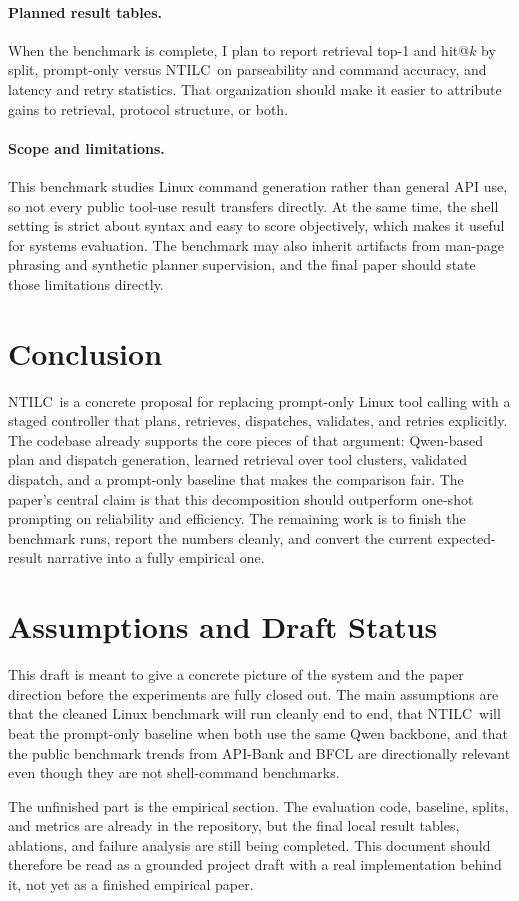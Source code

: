 \documentclass[10pt,twocolumn,letterpaper]{article}
\newcommand{\method}{NTILC}
\begin{document}
\paragraph{Planned result tables.}
When the benchmark is complete, I plan to report retrieval top-1 and hit@$k$ by split, prompt-only versus \method\ on parseability and command accuracy, and latency and retry statistics. That organization should make it easier to attribute gains to retrieval, protocol structure, or both.

\paragraph{Scope and limitations.}
This benchmark studies Linux command generation rather than general API use, so not every public tool-use result transfers directly. At the same time, the shell setting is strict about syntax and easy to score objectively, which makes it useful for systems evaluation. The benchmark may also inherit artifacts from man-page phrasing and synthetic planner supervision, and the final paper should state those limitations directly.

\section{Conclusion}
\method\ is a concrete proposal for replacing prompt-only Linux tool calling with a staged controller that plans, retrieves, dispatches, validates, and retries explicitly. The codebase already supports the core pieces of that argument: Qwen-based plan and dispatch generation, learned retrieval over tool clusters, validated dispatch, and a prompt-only baseline that makes the comparison fair. The paper's central claim is that this decomposition should outperform one-shot prompting on reliability and efficiency. The remaining work is to finish the benchmark runs, report the numbers cleanly, and convert the current expected-result narrative into a fully empirical one.

\section*{Assumptions and Draft Status}
This draft is meant to give a concrete picture of the system and the paper direction before the experiments are fully closed out. The main assumptions are that the cleaned Linux benchmark will run cleanly end to end, that \method\ will beat the prompt-only baseline when both use the same Qwen backbone, and that the public benchmark trends from API-Bank and BFCL are directionally relevant even though they are not shell-command benchmarks.

The unfinished part is the empirical section. The evaluation code, baseline, splits, and metrics are already in the repository, but the final local result tables, ablations, and failure analysis are still being completed. This document should therefore be read as a grounded project draft with a real implementation behind it, not yet as a finished empirical paper.
\end{document}
